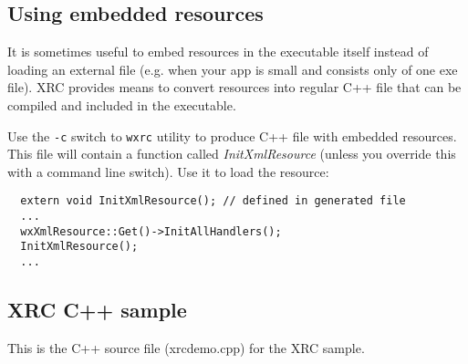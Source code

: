 \subsection{Using embedded resources}\label{embeddedresource}

It is sometimes useful to embed resources in the executable itself instead
of loading an external file (e.g. when your app is small and consists only of one
exe file). XRC provides means to convert resources into regular C++ file that
can be compiled and included in the executable. 

Use the {\tt -c} switch to
{\tt wxrc} utility to produce C++ file with embedded resources. This file will
contain a function called {\it InitXmlResource} (unless you override this with
a command line switch). Use it to load the resource:

\begin{verbatim}
  extern void InitXmlResource(); // defined in generated file
  ...
  wxXmlResource::Get()->InitAllHandlers();
  InitXmlResource();
  ...
\end{verbatim}

\subsection{XRC C++ sample}\label{xrccppsample}

This is the C++ source file (xrcdemo.cpp) for the XRC sample.

